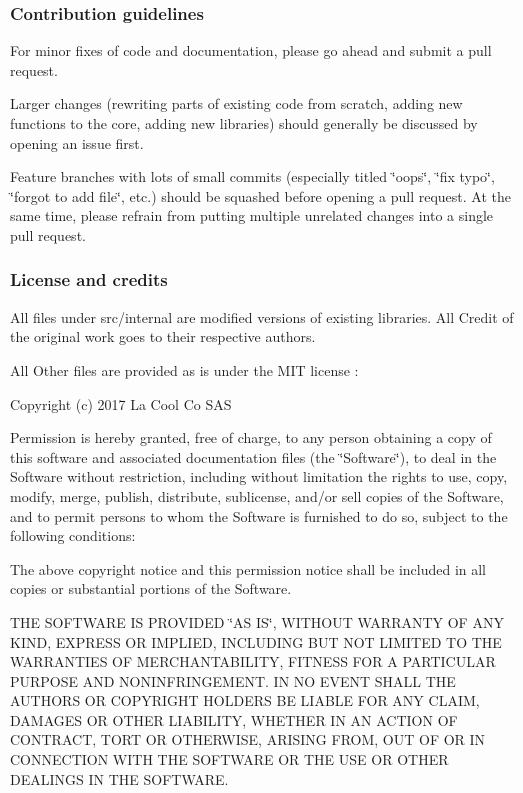\subsubsection*{Contribution guidelines}

For minor fixes of code and documentation, please go ahead and submit a pull request.

Larger changes (rewriting parts of existing code from scratch, adding new functions to the core, adding new libraries) should generally be discussed by opening an issue first.

Feature branches with lots of small commits (especially titled \char`\"{}oops\char`\"{}, \char`\"{}fix typo\char`\"{}, \char`\"{}forgot to add file\char`\"{}, etc.) should be squashed before opening a pull request. At the same time, please refrain from putting multiple unrelated changes into a single pull request.

\subsubsection*{License and credits}

All files under src/internal are modified versions of existing libraries. All Credit of the original work goes to their respective authors.

All Other files are provided as is under the M\+IT license \+:

Copyright (c) 2017 La Cool Co S\+AS

Permission is hereby granted, free of charge, to any person obtaining a copy of this software and associated documentation files (the \char`\"{}\+Software\char`\"{}), to deal in the Software without restriction, including without limitation the rights to use, copy, modify, merge, publish, distribute, sublicense, and/or sell copies of the Software, and to permit persons to whom the Software is furnished to do so, subject to the following conditions\+:

The above copyright notice and this permission notice shall be included in all copies or substantial portions of the Software.

T\+HE S\+O\+F\+T\+W\+A\+RE IS P\+R\+O\+V\+I\+D\+ED \char`\"{}\+A\+S I\+S\char`\"{}, W\+I\+T\+H\+O\+UT W\+A\+R\+R\+A\+N\+TY OF A\+NY K\+I\+ND, E\+X\+P\+R\+E\+SS OR I\+M\+P\+L\+I\+ED, I\+N\+C\+L\+U\+D\+I\+NG B\+UT N\+OT L\+I\+M\+I\+T\+ED TO T\+HE W\+A\+R\+R\+A\+N\+T\+I\+ES OF M\+E\+R\+C\+H\+A\+N\+T\+A\+B\+I\+L\+I\+TY, F\+I\+T\+N\+E\+SS F\+OR A P\+A\+R\+T\+I\+C\+U\+L\+AR P\+U\+R\+P\+O\+SE A\+ND N\+O\+N\+I\+N\+F\+R\+I\+N\+G\+E\+M\+E\+NT. IN NO E\+V\+E\+NT S\+H\+A\+LL T\+HE A\+U\+T\+H\+O\+RS OR C\+O\+P\+Y\+R\+I\+G\+HT H\+O\+L\+D\+E\+RS BE L\+I\+A\+B\+LE F\+OR A\+NY C\+L\+A\+IM, D\+A\+M\+A\+G\+ES OR O\+T\+H\+ER L\+I\+A\+B\+I\+L\+I\+TY, W\+H\+E\+T\+H\+ER IN AN A\+C\+T\+I\+ON OF C\+O\+N\+T\+R\+A\+CT, T\+O\+RT OR O\+T\+H\+E\+R\+W\+I\+SE, A\+R\+I\+S\+I\+NG F\+R\+OM, O\+UT OF OR IN C\+O\+N\+N\+E\+C\+T\+I\+ON W\+I\+TH T\+HE S\+O\+F\+T\+W\+A\+RE OR T\+HE U\+SE OR O\+T\+H\+ER D\+E\+A\+L\+I\+N\+GS IN T\+HE S\+O\+F\+T\+W\+A\+RE.

